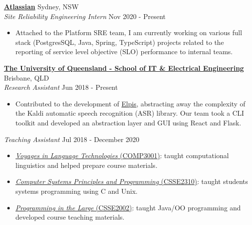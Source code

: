 \documentclass[a4paper]{article}
\newenvironment{myitemize}
{   \small
    \vspace{-2pt}
    \begin{itemize}
    \setlength{\itemsep}{0pt}
    \setlength{\parskip}{0pt}
    \setlength{\parsep}{0pt}     }
{ \end{itemize}                  }
\begin{document}
\textbf{\href{https://www.atlassian.com/}{Atlassian}} \hfill Sydney, NSW\\
\textit{Site Reliability Engineering Intern} \hfill Nov 2020 - Present \\
\begin{myitemize}
	\item Attached to the Platform SRE team, I am currently working on various full stack (PostgresSQL, Java, Spring, TypeScript) projects related to the reporting of service level objective (SLO) performance to internal teams.
\end{myitemize}

\textbf{\href{https://www.itee.uq.edu.au/}{The University of Queensland - School of IT \& Electrical Engineering}} \hfill Brisbane, QLD\\
\textit{Research Assistant} \hfill Jun 2018 - Present\\
\begin{myitemize} \itemsep 0.5mm
	\item Contributed to the development of \href{https://github.com/CoEDL/elpis}{Elpis}, abstracting away the complexity of the Kaldi automatic speech recognition (ASR) library. Our team took a CLI toolkit and developed an abstraction layer and GUI using React and Flask.
\end{myitemize}
\textit{Teaching Assistant} \hfill Jul 2018 - December 2020\\
\vspace{-0.5mm}
\begin{myitemize} \itemsep 0.5mm
	\item 
		\href{http://bit.ly/comp3001-ecp}
			{\textit{Voyages in Language Technologies} (COMP3001)}: 
			taught computational linguistics and helped prepare course materials.
	\item 
		\href{http://bit.ly/csse2310-ec}
			{\textit{Computer Systems Principles and Programming} (CSSE2310)}: 
			taught students systems programming using C and Unix.
	\item 
		\href{http://bit.ly/csse2002-ecp}
			{\textit{Programming in the Large} (CSSE2002)}: 
			taught Java/OO programming and developed course teaching materials.
\end{myitemize}
\end{document}
